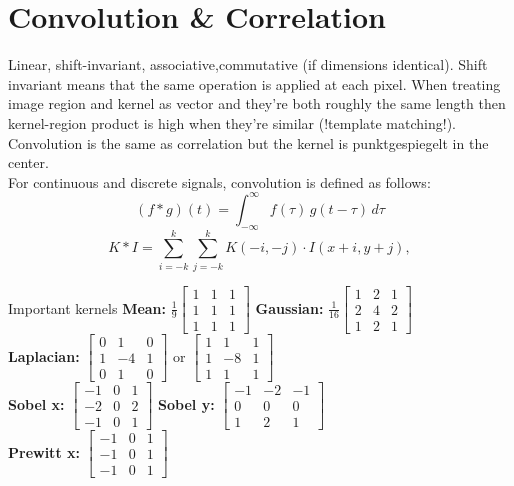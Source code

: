 \documentclass[a4paper,9pt]{article}
\begin{document}
\section{Convolution \& Correlation}
Linear, shift-invariant, associative,commutative (if dimensions identical).
Shift invariant means that the same operation is applied at each pixel.
When treating image region and kernel as vector and they're both roughly the same length then kernel-region product is high when they're similar (!template matching!).
Convolution is the same as correlation but the kernel is punktgespiegelt in the center.\\
For continuous and discrete signals, convolution is defined as follows:
$$(f*g)(t)=\int_{-\infty}^{\infty} f(\tau)\,g(t-\tau)\,d\tau$$
$$K * I = \sum_{i=-k}^{k} \sum_{j=-k}^{k} K(-i, -j) \cdot I(x+i, y+j),$$
\begin{subbox}
  {Important kernels}
  \textbf{Mean:} $\frac{1}{9}\begin{bmatrix} 1 & 1 & 1 \\ 1 & 1 & 1 \\ 1 & 1 & 1 \end{bmatrix}$ \quad
  \textbf{Gaussian:} $\frac{1}{16}\begin{bmatrix} 1 & 2 & 1 \\ 2 & 4 & 2 \\ 1 & 2 & 1 \end{bmatrix}$\\
  \textbf{Laplacian:} $\begin{bmatrix} 0 & 1 & 0 \\ 1 & -4 & 1 \\ 0 & 1 & 0 \end{bmatrix}$ or $\begin{bmatrix} 1 & 1 & 1 \\ 1 & -8 & 1 \\ 1 & 1 & 1 \end{bmatrix}$\\
  \textbf{Sobel x:} $\begin{bmatrix} -1 & 0 & 1 \\ -2 & 0 & 2 \\ -1 & 0 & 1 \end{bmatrix}$ \quad
  \textbf{Sobel y:} $\begin{bmatrix} -1 & -2 & -1 \\ 0 & 0 & 0 \\ 1 & 2 & 1 \end{bmatrix}$\\
  \textbf{Prewitt x:} $\begin{bmatrix} -1 & 0 & 1 \\ -1 & 0 & 1 \\ -1 & 0 & 1 \end{bmatrix}$ \quad

\end{subbox}
\end{document}
